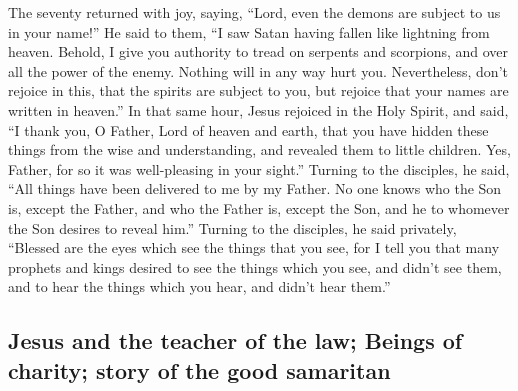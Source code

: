  The seventy returned with joy, saying, ``Lord, even the
demons are subject to us in your name!''  He said to
them, ``I saw Satan having fallen like lightning from heaven.
 Behold, I give you authority to tread on serpents and
scorpions, and over all the power of the enemy. Nothing will in any way
hurt you.  Nevertheless, don't rejoice in this, that the
spirits are subject to you, but rejoice that your names are written in
heaven.''  In that same hour, Jesus rejoiced in the Holy
Spirit, and said, ``I thank you, O Father, Lord of heaven and earth,
that you have hidden these things from the wise and understanding, and
revealed them to little children. Yes, Father, for so it was
well-pleasing in your sight.''  Turning to the disciples,
he said, ``All things have been delivered to me by my Father. No one
knows who the Son is, except the Father, and who the Father is, except
the Son, and he to whomever the Son desires to reveal him.''
 Turning to the disciples, he said privately, ``Blessed
are the eyes which see the things that you see,  for I
tell you that many prophets and kings desired to see the things which
you see, and didn't see them, and to hear the things which you hear, and
didn't hear them.''

\hypertarget{jesus-and-the-teacher-of-the-law-beings-of-charity-story-of-the-good-samaritan}{%
\subsection{Jesus and the teacher of the law; Beings of charity; story
of the good
samaritan}\label{jesus-and-the-teacher-of-the-law-beings-of-charity-story-of-the-good-samaritan}}


